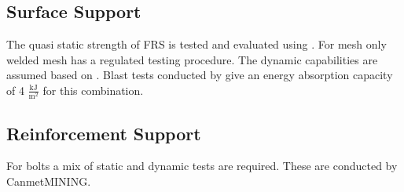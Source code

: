 \subsection{Surface Support}

The quasi static strength of FRS is tested and evaluated using \autocite{c1550}. 
For mesh only welded mesh has a regulated testing procedure.
The dynamic capabilities are assumed based on \textcite{Potvin10}.
Blast tests conducted by \autocite[9]{shirzadegan16} give an energy absorption capacity of 4 \(\frac{\text{kJ}}{\text{m}^2}\) for this combination.

\subsection{Reinforcement Support}

For bolts a mix of static and dynamic tests are required. These are conducted by CanmetMINING. \autocite{Winsa18}